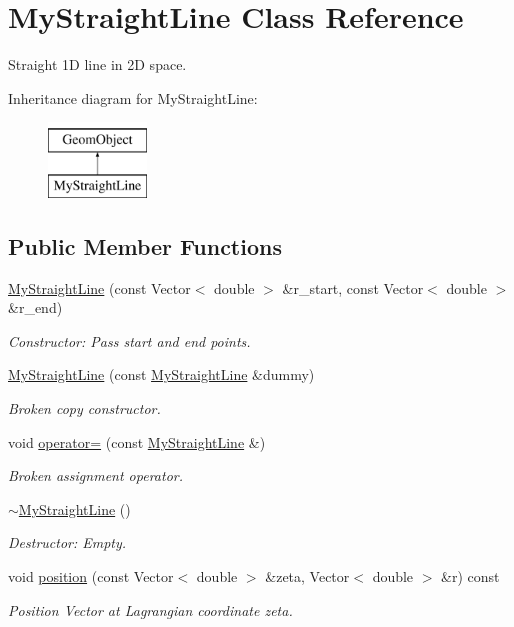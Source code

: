 \hypertarget{classMyStraightLine}{}\section{My\+Straight\+Line Class Reference}
\label{classMyStraightLine}


Straight 1D line in 2D space.  


Inheritance diagram for My\+Straight\+Line\+:\begin{figure}[H]
\begin{center}
\leavevmode
\includegraphics[height=2.000000cm]{classMyStraightLine}
\end{center}
\end{figure}
\subsection*{Public Member Functions}
\begin{DoxyCompactItemize}
\item 
\hyperlink{classMyStraightLine_a2c63e574f21703250a31fc446ab8045d}{My\+Straight\+Line} (const Vector$<$ double $>$ \&r\+\_\+start, const Vector$<$ double $>$ \&r\+\_\+end)
\begin{DoxyCompactList}\small\item\em Constructor\+: Pass start and end points. \end{DoxyCompactList}\item 
\hyperlink{classMyStraightLine_a4c42312f35a3cf72f2f39e88ad28202f}{My\+Straight\+Line} (const \hyperlink{classMyStraightLine}{My\+Straight\+Line} \&dummy)
\begin{DoxyCompactList}\small\item\em Broken copy constructor. \end{DoxyCompactList}\item 
void \hyperlink{classMyStraightLine_a926ab921fec52ded94509efce06b66a7}{operator=} (const \hyperlink{classMyStraightLine}{My\+Straight\+Line} \&)
\begin{DoxyCompactList}\small\item\em Broken assignment operator. \end{DoxyCompactList}\item 
\hyperlink{classMyStraightLine_ae2f9a5860652a726b2f4dc94d1332ef1}{$\sim$\+My\+Straight\+Line} ()
\begin{DoxyCompactList}\small\item\em Destructor\+: Empty. \end{DoxyCompactList}\item 
void \hyperlink{classMyStraightLine_ae3ee51a7b81acc2ef652bec4ee955d2f}{position} (const Vector$<$ double $>$ \&zeta, Vector$<$ double $>$ \&r) const
\begin{DoxyCompactList}\small\item\em Position Vector at Lagrangian coordinate zeta. \end{DoxyCompactList}\end{DoxyCompactItemize}
